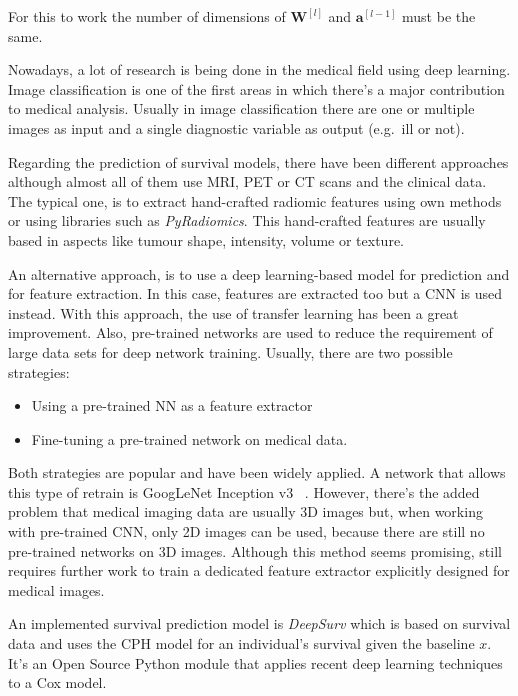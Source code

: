For this to work the number of dimensions of \( \bm{W}^{[l]} \) and \( \bm{a}^{[l - 1]} \)
must be the same. 


Nowadays, a lot of research is being done in the medical field using deep learning. Image
classification is one of the first areas in which there's a major contribution to medical analysis.
Usually in image classification there are one or multiple images as input and a single diagnostic 
variable as output (e.g.~ill or not).
~\cite{medical:survey-deep-learning}

Regarding the prediction of survival models, there have been different approaches although
almost all of them use \gls{MRI}, \gls{PET} or \gls{CT} scans and the clinical data. 
The typical one, is to extract hand-crafted radiomic features using own methods or using 
libraries such as \emph{PyRadiomics}. This 
hand-crafted features are usually based in aspects like tumour shape, intensity, volume or texture.
~\cites{medical:tumour-radiomics}{medical:py-radiomics}{medical:computational-radiomics}

An alternative approach, is to use a deep learning-based model for prediction and for feature
extraction. In this case, features are extracted too but a \gls{CNN} 
is used instead. With this approach, the use of transfer learning has been a
great improvement. Also, pre-trained networks are used to reduce the requirement of large data
sets for deep network training. Usually, there are two possible strategies: 
\begin{itemize}
  \item Using a pre-trained NN as a feature extractor
  \item Fine-tuning a pre-trained network on medical data.
\end{itemize}

Both strategies are popular and have been widely applied. A network that allows this type
of retrain is GoogLeNet Inception v3
~\cites{neural:goog-le-net}{neural:retrain}{neural:inception-retrain}.
However, there's the added problem that medical imaging data are usually 3D images but, 
when working with pre-trained \gls{CNN}, only 2D images can be used, because there are still no 
pre-trained networks on 3D images. Although this method seems promising, still requires 
further work to train a dedicated feature extractor explicitly designed for medical images.
~\cite{medical:deep-learning-radiomics-gbm}

An implemented survival prediction model is \emph{DeepSurv} which is based on survival data
and uses the \gls{CPH} model for an individual's survival given the \gls{baseline}
\( x \). It's an Open Source Python module that applies recent deep learning techniques 
to a Cox model.
~\cites{medical:deep-surv}{medical:cox}


